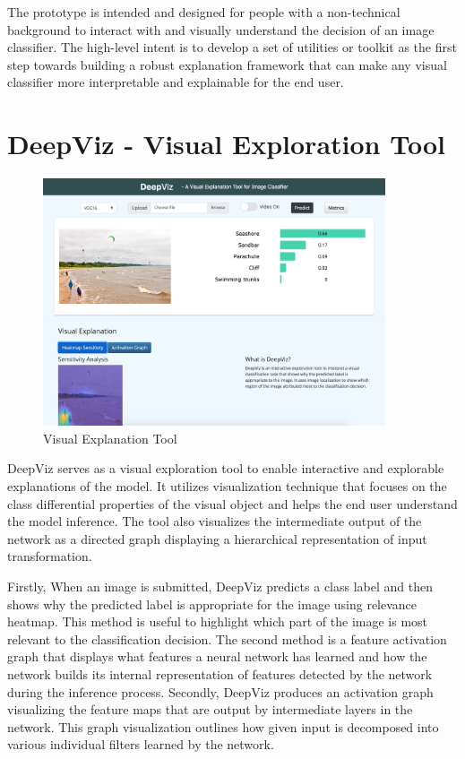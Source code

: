 The prototype is intended and designed for people with a non-technical background to interact with and visually understand the decision of an image classifier. The high-level intent is to develop a set of utilities or toolkit as the first step towards building a robust explanation framework that can make any visual classifier more interpretable and explainable for the end user.


\section{DeepViz - Visual Exploration Tool}

\begin{figure}[htbp]
\centering
\includegraphics[width=0.90\textwidth]{images/DeepViz001.png}
\caption{Visual Explanation Tool}
\label{fig:DeepViz - Visual Explanation Tool}
\end{figure}

DeepViz serves as a visual exploration tool to enable interactive and explorable explanations of the model. It utilizes visualization technique that focuses on the class differential properties of the visual object and helps the end user understand the model inference. The tool also visualizes the intermediate output of the network as a directed graph displaying a hierarchical representation of input transformation.

Firstly, When an image is submitted, DeepViz predicts a class label and then shows why the predicted label is appropriate for the image using relevance heatmap. This method is useful to highlight which part of the image is most relevant to the classification decision. The second method is a feature activation graph that displays what features a neural network has learned and how the network builds its internal representation of features detected by the network during the inference process. Secondly, DeepViz produces an activation graph visualizing the feature maps that are output by intermediate layers in the network. This graph visualization outlines how given input is decomposed into various individual filters learned by the network.

